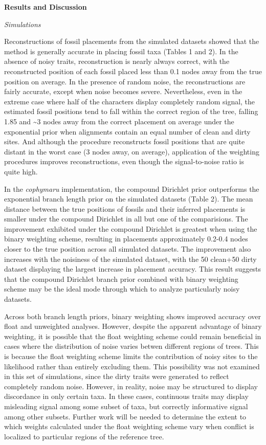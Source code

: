 \documentclass[12pt]{article}
\begin{document}
\noindent\textbf{Results and Discussion}

\noindent\emph{Simulations}

Reconstructions of fossil placements from the simulated datasets showed
that the method is generally accurate in placing fossil taxa (Tables 1 and 2).
In the absence of noisy traits, reconstruction is nearly always correct,
with the reconstructed position of each fossil placed less than 0.1
nodes away from the true position on average. In the presence of random
noise, the reconstructions are fairly accurate, except when noise
becomes severe. Nevertheless, even in the extreme case where half 
of the characters display completely random signal, the estimated fossil positions
tend to fall within the correct region of the tree, falling 1.85 and
\textasciitilde{}3 nodes away from the correct placement on average under the exponential prior when
alignments contain an equal number of clean and dirty sites. And although the procedure
reconstructs fossil positions that are quite distant in the worst case (3 nodes away, on average),
application of the weighting procedures improves reconstructions, even though
the signal-to-noise ratio is quite high.

In the \emph{cophymaru} implementation, the compound Dirichlet prior
outperforms the exponential branch length prior on the simulated datasets (Table 2).
The mean distance between the true positions of fossils and their inferred placements is
smaller under the compound Dirichlet in all but one of the comparisions. The improvement
exhibited under the compound Dirichlet is greatest when using the binary weighting scheme,
resulting in placements approximately 0.2-0.4 nodes closer to the true position across all
simulated datasets. The improvement also increases with the noisiness of the simulated 
dataset, with the 50 clean+50 dirty dataset displaying the largest increase in placement accuracy.
This result suggests that the compound Dirichlet branch prior combined with  binary weighting scheme
may be the ideal mode through which to analyze particularly noisy datasets.

Across both branch length priors, binary weighting shows improved accuracy over float and
unweighted analyses. However, despite the apparent advantage of binary
weighting, it is possible that the float weighting scheme could remain
beneficial in cases where the distribution of noise varies betwen
different regions of trees. This is because the float weighting scheme
limits the contribution of noisy sites to the likelihood rather than
entirely excluding them. This possibility was not examined in this set
of simulations, since the dirty traits were generated to reflect
completely random noise. However, in reality, noise may be structured to
display discordance in only certain taxa. In these cases, continuous traits may display misleading
signal among some subset of taxa, but correctly informative signal among
other subsets. Further work will be needed to determine the extent to which 
weights calculated under the float weighting scheme vary when conflict is 
localized to particular regions of the reference tree.
\end{document}
